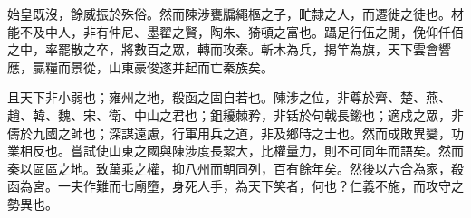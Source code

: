 \begin{pinyinscope}
始皇既沒，餘威振於殊俗。然而陳涉甕牖繩樞之子，甿隸之人，而遷徙之徒也。材能不及中人，非有仲尼、墨翟之賢，陶朱、猗頓之富也。躡足行伍之閒，俛仰仟佰之中，率罷散之卒，將數百之眾，轉而攻秦。斬木為兵，揭竿為旗，天下雲會響應，贏糧而景從，山東豪俊遂并起而亡秦族矣。

且天下非小弱也；雍州之地，殽函之固自若也。陳涉之位，非尊於齊、楚、燕、趙、韓、魏、宋、衛、中山之君也；鉏耰棘矜，非铦於句戟長鎩也；適戍之眾，非儔於九國之師也；深謀遠慮，行軍用兵之道，非及鄉時之士也。然而成敗異變，功業相反也。嘗試使山東之國與陳涉度長絜大，比權量力，則不可同年而語矣。然而秦以區區之地。致萬乘之權，抑八州而朝同列，百有餘年矣。然後以六合為家，殽函為宮。一夫作難而七廟墮，身死人手，為天下笑者，何也？仁義不施，而攻守之勢異也。


\end{pinyinscope}